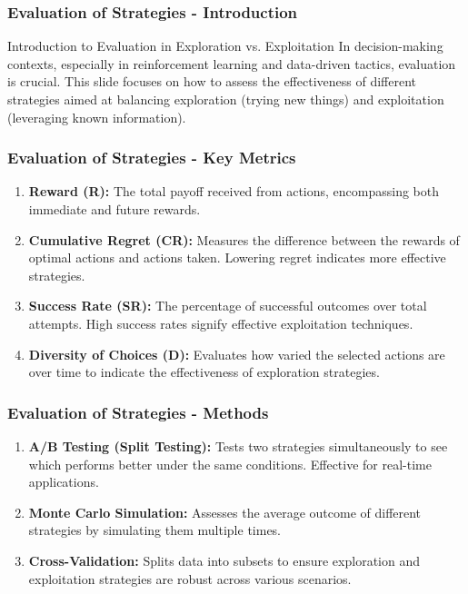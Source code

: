 \documentclass[aspectratio=169]{beamer}
\begin{document}
\begin{frame}[fragile]
    \frametitle{Evaluation of Strategies - Introduction}
    \begin{block}{Introduction to Evaluation in Exploration vs. Exploitation}
        In decision-making contexts, especially in reinforcement learning and data-driven tactics, evaluation is crucial. This slide focuses on how to assess the effectiveness of different strategies aimed at balancing exploration (trying new things) and exploitation (leveraging known information).
    \end{block}
\end{frame}

\begin{frame}[fragile]
    \frametitle{Evaluation of Strategies - Key Metrics}
    \begin{enumerate}
        \item \textbf{Reward (R):} The total payoff received from actions, encompassing both immediate and future rewards.
        \item \textbf{Cumulative Regret (CR):} Measures the difference between the rewards of optimal actions and actions taken. Lowering regret indicates more effective strategies.
        \item \textbf{Success Rate (SR):} The percentage of successful outcomes over total attempts. High success rates signify effective exploitation techniques.
        \item \textbf{Diversity of Choices (D):} Evaluates how varied the selected actions are over time to indicate the effectiveness of exploration strategies.
    \end{enumerate}
\end{frame}

\begin{frame}[fragile]
    \frametitle{Evaluation of Strategies - Methods}
    \begin{enumerate}
        \item \textbf{A/B Testing (Split Testing):} Tests two strategies simultaneously to see which performs better under the same conditions. Effective for real-time applications.
        \item \textbf{Monte Carlo Simulation:} Assesses the average outcome of different strategies by simulating them multiple times.
        \item \textbf{Cross-Validation:} Splits data into subsets to ensure exploration and exploitation strategies are robust across various scenarios.
    \end{enumerate}
\end{frame}
\end{document}
